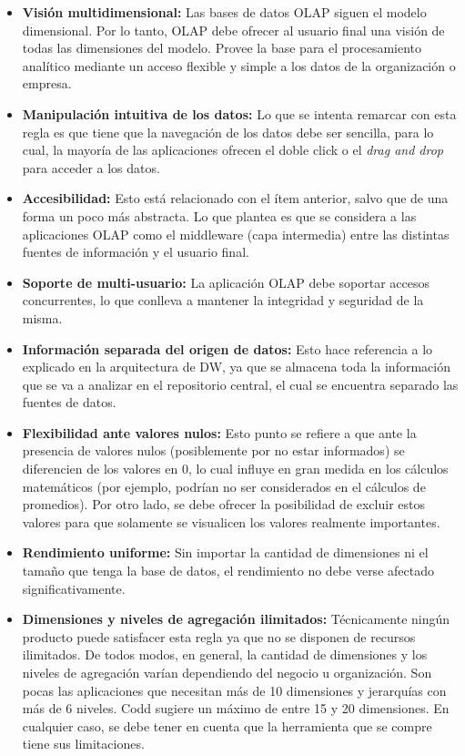 \documentclass[a4paper,11pt]{article}
\begin{document}
    \begin{itemize}
      \item \textbf{Visión multidimensional:} Las bases de datos OLAP siguen el modelo dimensional. Por lo tanto, OLAP debe ofrecer al usuario final
      una visión de todas las dimensiones del modelo. Provee la base para el procesamiento analítico mediante un acceso flexible y simple a los datos de la 
      organización o empresa.
      \item \textbf{Manipulación intuitiva de los datos:} Lo que se intenta remarcar con esta regla es que tiene que la navegación de los datos debe ser
      sencilla, para lo cual, la mayoría de las aplicaciones ofrecen el doble click o el \textit{drag and drop} para acceder a los datos.
      \item \textbf{Accesibilidad:} Esto está relacionado con el ítem anterior, salvo que de una forma un poco más abstracta. Lo que plantea es que se
      considera a las aplicaciones OLAP como el middleware (capa intermedia) entre las distintas fuentes de información y el usuario final.
      \item \textbf{Soporte de multi-usuario:} La aplicación OLAP debe soportar accesos concurrentes, lo que conlleva a mantener la integridad y seguridad
      de la misma.
      \item \textbf{Información separada del origen de datos:} Esto hace referencia a lo explicado en la arquitectura de DW, ya que se almacena toda la
      información que se va a analizar en el repositorio central, el cual se encuentra separado las fuentes de datos.
      \item \textbf{Flexibilidad ante valores nulos:} Esto punto se refiere a que ante la presencia de valores nulos (posiblemente por no estar informados)
      se diferencien de los valores en 0, lo cual influye en gran medida en los cálculos matemáticos (por ejemplo, podrían no ser considerados en el cálculos
      de promedios). Por otro lado, se debe ofrecer la posibilidad de excluir estos valores para que solamente se visualicen los valores realmente
      importantes.
      \item \textbf{Rendimiento uniforme:} Sin importar la cantidad de dimensiones ni el tamaño que tenga la base de datos, el rendimiento no debe verse
      afectado significativamente.
      \item \textbf{Dimensiones y niveles de agregación ilimitados:} Técnicamente ningún producto puede satisfacer esta regla ya que no se disponen de
      recursos ilimitados. De todos modos, en general, la cantidad de dimensiones y los niveles de agregación varían dependiendo del negocio u organización.
      Son pocas las aplicaciones que necesitan más de 10 dimensiones y jerarquías con más de 6 niveles. Codd sugiere un máximo de entre 15 y 20 dimensiones.
      En cualquier caso, se debe tener en cuenta que la herramienta que se compre tiene sus limitaciones.
    \end{itemize}
    
\end{document}
